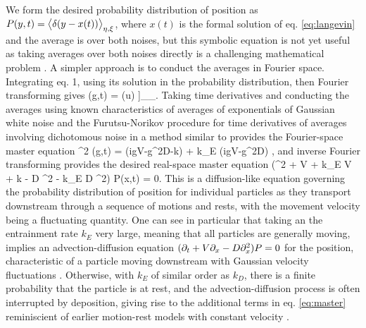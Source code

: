 We form the desired probability distribution of position as $ P(y,t) = \big\langle \delta(y-x(t))\big\rangle_{\eta,\xi} $, where $x(t)$ is the formal solution of eq. \ref{eq:langevin} and the average is over both noises, but this symbolic equation is not yet useful as taking averages over both noises directly is a challenging mathematical problem \citep{Hanggi1978}.
A simpler approach is to conduct the averages in Fourier space. Integrating eq. 1, using its solution in the probability distribution, then Fourier transforming gives
\be {}(g,t) = \Big\bra  \Big\bra \exp \Big[- i g \int_0^t du [V+\sqrt{2D}\xi(u)]\eta(u) \Big]\Big\ket_\eta \Big\ket_\xi.\ee
Taking time derivatives and conducting the averages using known characteristics of averages of exponentials of Gaussian white noise \citep{Gardiner1983,VanKampen1978} and the Furutsu-Norikov procedure for time derivatives of averages involving dichotomous noise \citep{Loginov1978} in a method similar to \citep{Balakrishnan1993} provides the Fourier-space master equation
\be \pt^2 (g,t)  = (igV-g^2D-k)\pt  {} + k_E (igV-g^2D) ,\ee
and inverse Fourier transforming provides the desired real-space master equation
\be (\pt^2 + V \px \pt + k_E V \px + k \pt - D \px^2 \pt - k_E D \px^2) P(x,t) = 0. \label{eq:master}\ee
This is a diffusion-like equation governing the probability distribution of position for individual particles as they transport downstream through a sequence of motions and rests, with the movement velocity being a fluctuating quantity.
One can see in particular that taking an the entrainment rate $k_E$ very large, meaning that all particles are generally moving, implies an advection-diffusion equation $(\partial_t + V\partial_x -D \partial_x^2)P=0$ for the position, characteristic of a particle moving downstream with Gaussian velocity fluctuations \citep{Ancey2014}. Otherwise, with $k_E$ of similar order as $k_D$, there is a finite probability that the particle is at rest, and the advection-diffusion process is often interrupted by deposition, giving rise to the additional terms in eq. \ref{eq:master} reminiscient of earlier motion-rest models with constant velocity \citep{Lisle1998,Lajeunesse2017}.

